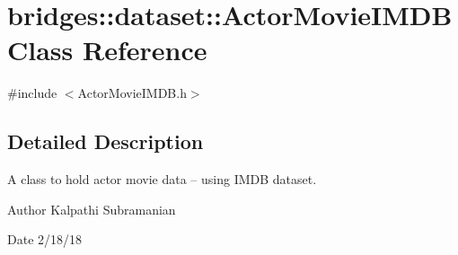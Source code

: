 \hypertarget{classbridges_1_1dataset_1_1_actor_movie_i_m_d_b}{}\section{bridges\+::dataset\+::Actor\+Movie\+I\+M\+DB Class Reference}
\label{classbridges_1_1dataset_1_1_actor_movie_i_m_d_b}


{\ttfamily \#include $<$Actor\+Movie\+I\+M\+D\+B.\+h$>$}



\subsection{Detailed Description}
A class to hold actor movie data -- using I\+M\+DB dataset. 

\begin{DoxyAuthor}{Author}
Kalpathi Subramanian 
\end{DoxyAuthor}
\begin{DoxyDate}{Date}
2/18/18 
\end{DoxyDate}
